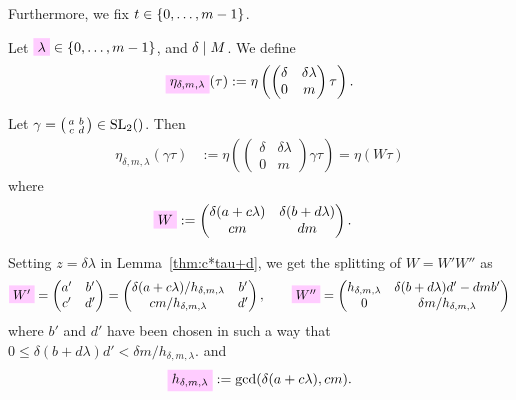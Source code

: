 \documentclass{article}
\begin{document}
Furthermore, we fix $t\in\left\{0,\ldots,m-1\right\}$.

Let $\defineNotation[lambda]{\lambda} \in \Set{0,\ldots,m-1}$, and
$\delta \mid M$.
%
We define
\begin{gather}
  \defineNotation[eta-delta-m-lambda-tau]{\eta_{\delta,m,\lambda}}(\tau)
  := \eta \left(
    \begin{pmatrix}\delta& \delta \lambda\\0&m\end{pmatrix} \tau
  \right).
\label{eq:eta_delta-m-lambda(tau)}
\end{gather}

Let
$\gamma=\left(\begin{smallmatrix}a&b\\c&d\end{smallmatrix}\right) \in
\SL2Z$.
%
Then
\begin{align}
  \eta_{\delta,m,\lambda}(\gamma \tau)
  &:= \eta
\left(
  \begin{pmatrix}\delta& \delta \lambda\\0&m\end{pmatrix}
  \gamma
  \tau
\right)
=
\eta(W \tau)
\end{align}
where
\begin{align}
  \defineNotation[W]{W}
  &:=
  \begin{pmatrix}
    \delta (a + c \lambda) & \delta (b + d \lambda)\\
    c m                   & d m
  \end{pmatrix}.
  \label{eq:W_delta-m-lambda}
\end{align}

Setting $z = \delta \lambda$ in Lemma~\ref{thm:c*tau+d}, we get the
splitting of $W = W' W''$ as
%
\begin{gather}
  \defineNotation[W']{W'}
  =
  \begin{pmatrix}
    a' & b'\\
    c' & d'
  \end{pmatrix}
  = \begin{pmatrix}
      \delta(a+c \lambda)/h_{\delta,m,\lambda} & b'\\
      cm/h_{\delta,m,\lambda}                  & d'
    \end{pmatrix},
  \qquad
  \defineNotation[W'']{W''}
  =
  \begin{pmatrix}
    h_{\delta,m,\lambda} & \delta (b + d \lambda) d' - d m b'\\
    0               & \delta m / h_{\delta,m,\lambda}
  \end{pmatrix}
  \label{eq:split-W_delta-m-lambda}
\end{gather}
where $b'$ and $d'$ have been chosen in such a way that
$0\le  \delta (b + d \lambda) d' < \delta m / h_{\delta,m,\lambda}$.
and
\begin{gather}
  \defineNotation[h-delta-m-lambda]{h_{\delta,m,\lambda}} :=
  \gcd(\delta (a + c \lambda), cm).
\end{gather}
\end{document}
